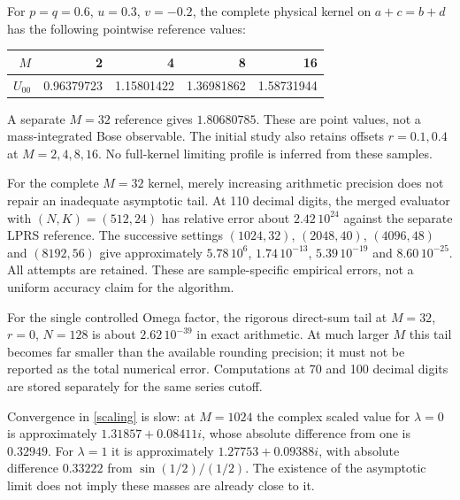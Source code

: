 For $p=q=0.6$, $u=0.3$, $v=-0.2$, the complete physical kernel
on $a+c=b+d$ has the following pointwise reference values:
\begin{center}
\begin{tabular}{rrrrr}\toprule
$M$ & 2 & 4 & 8 & 16\\\midrule
$U_{00}$ & 0.96379723 & 1.15801422 & 1.36981862 & 1.58731944\\
\bottomrule\end{tabular}
\end{center}
A separate $M=32$ reference gives $1.80680785$.
These are point values, not a mass-integrated Bose observable.
The initial study also retains offsets $r=0.1,0.4$ at $M=2,4,8,16$.
No full-kernel limiting profile is inferred from these samples.

For the complete $M=32$ kernel, merely increasing arithmetic precision
does not repair an inadequate asymptotic tail. At 110 decimal digits,
the merged evaluator with $(N,K)=(512,24)$ has relative error about
$2.42\,10^{24}$ against the separate LPRS reference. The successive
settings $(1024,32)$, $(2048,40)$, $(4096,48)$ and $(8192,56)$ give
approximately $5.78\,10^6$, $1.74\,10^{-13}$, $5.39\,10^{-19}$ and
$8.60\,10^{-25}$. All attempts are retained. These are sample-specific
empirical errors, not a uniform accuracy claim for the algorithm.

For the single controlled Omega factor, the rigorous direct-sum
tail at $M=32$, $r=0$, $N=128$ is about $2.62\,10^{-39}$ in
exact arithmetic. At much larger $M$ this tail becomes far smaller
than the available rounding precision; it must not be reported as
the total numerical error. Computations at 70 and 100 decimal digits
are stored separately for the same series cutoff.

Convergence in \eqref{scaling} is slow: at $M=1024$ the complex scaled
value for $\lambda=0$ is approximately $1.31857+0.08411i$,
whose absolute difference from one is $0.32949$.
For $\lambda=1$ it is approximately $1.27753+0.09388i$,
with absolute difference $0.33222$ from $\sin(1/2)/(1/2)$.
The existence of the asymptotic limit does not imply these masses
are already close to it.

